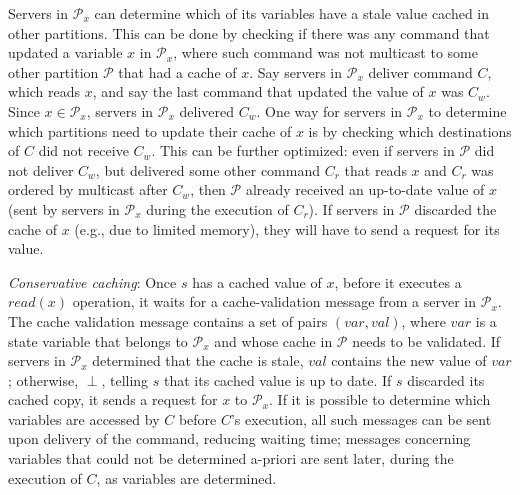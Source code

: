 \documentclass[10pt, conference, compsocconf, letterpaper]{IEEEtranv17}
\newcommand{\ppm}{\mathcal{P}}
\begin{document}
Servers in $\ppm_x$ can determine which of its variables have a stale value cached in other partitions. This can be done by checking if there was any command that updated a variable $x$ in $\ppm_x$, where such command was not multicast to some other partition $\ppm$ that had a cache of $x$. Say servers in $\ppm_x$ deliver command $C$, which reads $x$, and say the last command that updated the value of $x$ was $C_w$. Since $x \in \ppm_x$, servers in $\ppm_x$ delivered $C_w$. One way for servers in $\ppm_x$ to determine which partitions need to update their cache of $x$ is by checking which destinations of $C$ did not receive $C_w$. This can be further optimized: even if servers in $\ppm$ did not deliver $C_w$, but delivered some other command $C_r$ that reads $x$ and $C_r$ was ordered by multicast after $C_w$, then $\ppm$ already received an up-to-date value of $x$ (sent by servers in $\ppm_x$ during the execution of $C_r$). If servers in $\ppm$ discarded the cache of $x$ (e.g., due to limited memory), they will have to send a request for its value.


\emph{Conservative caching}: Once $s$ has a cached value of $x$, before it executes a $read(x)$ operation, it waits for a cache-validation message from a server in $\ppm_x$. The cache validation message contains a set of pairs $(var, val)$, where $var$ is a state variable that belongs to $\ppm_x$ and whose cache in $\ppm$ needs to be validated. 
If servers in $\ppm_x$ determined that the cache is stale, $val$ contains the new value of $var$; otherwise, $\perp$, telling $s$ that its cached value is up to date.
If $s$ discarded its cached copy, it sends a request for $x$ to $\ppm_x$.
If it is possible to determine which variables are accessed by $C$ before $C$'s execution, all such messages can be sent upon delivery of the command, reducing waiting time; messages concerning variables that could not be determined a-priori are sent later, during the execution of $C$, as variables are determined.
\end{document}
